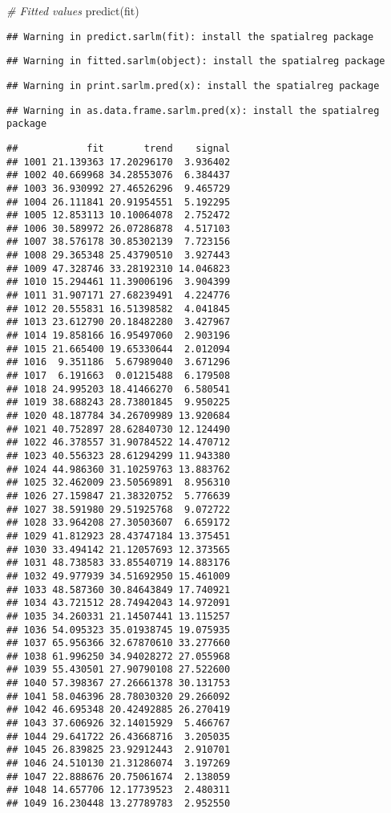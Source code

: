 \documentclass[
]{article}
\newenvironment{Shaded}{\begin{snugshade}}{\end{snugshade}}
\newcommand{\CommentTok}[1]{\textcolor[rgb]{0.56,0.35,0.01}{\textit{#1}}}
\newcommand{\FunctionTok}[1]{\textcolor[rgb]{0.00,0.00,0.00}{#1}}
\newcommand{\NormalTok}[1]{#1}
\begin{document}
\begin{Shaded}
\begin{Highlighting}[]
\CommentTok{\# Fitted values}
\FunctionTok{predict}\NormalTok{(fit)}
\end{Highlighting}
\end{Shaded}

\begin{verbatim}
## Warning in predict.sarlm(fit): install the spatialreg package
\end{verbatim}

\begin{verbatim}
## Warning in fitted.sarlm(object): install the spatialreg package
\end{verbatim}

\begin{verbatim}
## Warning in print.sarlm.pred(x): install the spatialreg package
\end{verbatim}

\begin{verbatim}
## Warning in as.data.frame.sarlm.pred(x): install the spatialreg package
\end{verbatim}

\begin{verbatim}
##            fit       trend    signal
## 1001 21.139363 17.20296170  3.936402
## 1002 40.669968 34.28553076  6.384437
## 1003 36.930992 27.46526296  9.465729
## 1004 26.111841 20.91954551  5.192295
## 1005 12.853113 10.10064078  2.752472
## 1006 30.589972 26.07286878  4.517103
## 1007 38.576178 30.85302139  7.723156
## 1008 29.365348 25.43790510  3.927443
## 1009 47.328746 33.28192310 14.046823
## 1010 15.294461 11.39006196  3.904399
## 1011 31.907171 27.68239491  4.224776
## 1012 20.555831 16.51398582  4.041845
## 1013 23.612790 20.18482280  3.427967
## 1014 19.858166 16.95497060  2.903196
## 1015 21.665400 19.65330644  2.012094
## 1016  9.351186  5.67989040  3.671296
## 1017  6.191663  0.01215488  6.179508
## 1018 24.995203 18.41466270  6.580541
## 1019 38.688243 28.73801845  9.950225
## 1020 48.187784 34.26709989 13.920684
## 1021 40.752897 28.62840730 12.124490
## 1022 46.378557 31.90784522 14.470712
## 1023 40.556323 28.61294299 11.943380
## 1024 44.986360 31.10259763 13.883762
## 1025 32.462009 23.50569891  8.956310
## 1026 27.159847 21.38320752  5.776639
## 1027 38.591980 29.51925768  9.072722
## 1028 33.964208 27.30503607  6.659172
## 1029 41.812923 28.43747184 13.375451
## 1030 33.494142 21.12057693 12.373565
## 1031 48.738583 33.85540719 14.883176
## 1032 49.977939 34.51692950 15.461009
## 1033 48.587360 30.84643849 17.740921
## 1034 43.721512 28.74942043 14.972091
## 1035 34.260331 21.14507441 13.115257
## 1036 54.095323 35.01938745 19.075935
## 1037 65.956366 32.67870610 33.277660
## 1038 61.996250 34.94028272 27.055968
## 1039 55.430501 27.90790108 27.522600
## 1040 57.398367 27.26661378 30.131753
## 1041 58.046396 28.78030320 29.266092
## 1042 46.695348 20.42492885 26.270419
## 1043 37.606926 32.14015929  5.466767
## 1044 29.641722 26.43668716  3.205035
## 1045 26.839825 23.92912443  2.910701
## 1046 24.510130 21.31286074  3.197269
## 1047 22.888676 20.75061674  2.138059
## 1048 14.657706 12.17739523  2.480311
## 1049 16.230448 13.27789783  2.952550
\end{verbatim}
\end{document}
